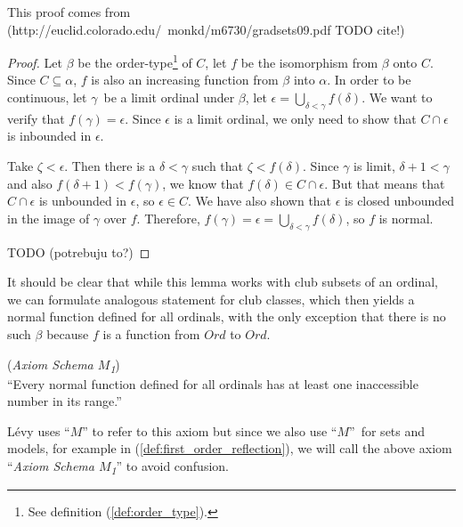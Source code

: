 This proof comes from (http://euclid.colorado.edu/~monkd/m6730/gradsets09.pdf TODO cite!)
\begin{proof}
\bce[(i)]
\item Let $\beta$ be the order-type\footnote{See definition (\ref{def:order_type}).} of $C$, let $f$ be the isomorphism from $\beta$ onto $C$. Since $C \subseteq \alpha$, $f$ is also an increasing function from $\beta$ into $\alpha$. In order to be continuous, let $\gamma$ be a limit ordinal under $\beta$, let $\epsilon = \bigcup_{\delta<\gamma} f(\delta)$. We want to verify that $f(\gamma) = \epsilon$. Since $\epsilon$ is a limit ordinal, we only need to show that $C \cap \epsilon$ is inbounded in $\epsilon$.

Take $\zeta < \epsilon$. Then there is a $\delta < \gamma$ such that $\zeta < f(\delta)$. 
Since $\gamma$ is limit, $\delta + 1 < \gamma$ and also $f(\delta + 1) < f(\gamma)$, we know that $f(\delta) \in C \cap \epsilon$. 
But that means that $C \cap \epsilon$ is unbounded in $\epsilon$, so $\epsilon \in C$. We have also shown that $\epsilon$ is closed unbounded in the image of $\gamma$ over $f$.
Therefore, $f(\gamma) = \epsilon = \bigcup_{\delta < \gamma} f(\delta)$, so $f$ is normal.

\item TODO  (potrebuju to?)
\ece
\end{proof}
It should be clear that while this lemma works with club subsets of an ordinal, we can formulate analogous statement for club classes, which then yields a normal function defined for all ordinals, with the only exception that there is no such $\beta$ because $f$ is a function from $Ord$ to $Ord$.


\begin{definition}{(\emph{Axiom Schema $M$\textsubscript{1}})}\label{def:levy_m}\\
``Every normal function defined for all ordinals has at least one inaccessible number in its range.''
\end{definition}
Lévy uses ``$M$'' to refer to this axiom but since we also use ``$M$'' for sets and models, for example in (\ref{def:first_order_reflection}), we will call the above axiom ``\emph{Axiom Schema $M$\textsubscript{1}}'' to avoid confusion.

